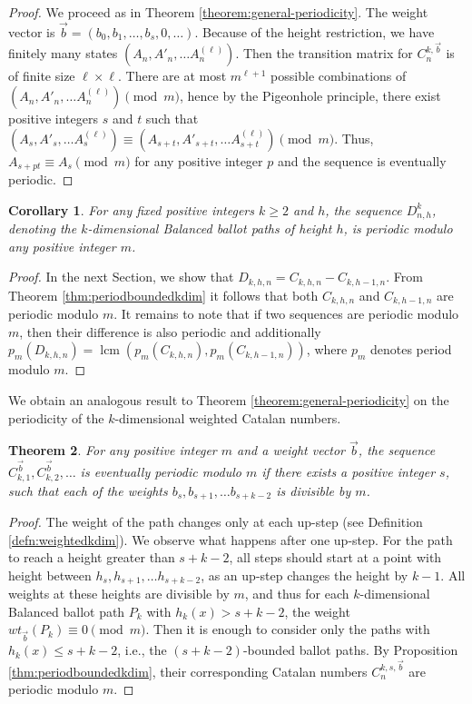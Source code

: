 \documentclass[12pt,notitlepage]{amsart}
\numberwithin{equation}{section}
\theoremstyle{thmstyleone}%
\newtheorem{theorem}{Theorem}[section]%
\newtheorem{corollary}[theorem]{Corollary}%
\theoremstyle{thmstyletwo}%
\theoremstyle{thmstylethree}%
\numberwithin{theorem}{section}
\numberwithin{equation}{section}
\begin{document}
\begin{proof}
    We proceed as in Theorem \ref{theorem:general-periodicity}. The weight vector is $\vec{b} = (b_0,b_1,\ldots,b_s,0,\ldots)$. Because of the height restriction, we have finitely many states $(A_n, A'_n,\ldots A^{(\ell)}_n)$. Then the transition matrix for $C^{k,\vec{b}}_n$ is of finite size $\ell \times \ell$. There are at most $m^{\ell+1}$ possible combinations of $(A_n, A'_n,\ldots A_n^{(\ell)}) \pmod m$, hence by the Pigeonhole principle, there exist positive integers $s$ and $t$ such that $(A_s,A'_s,\ldots A_s^{(\ell)}) \equiv (A_{s+t},A'_{s+t},\ldots A^{(\ell)}_{s+t}) \pmod m$. Thus, $A_{s+pt} \equiv A_{s} \pmod m$ for any positive integer $p$ and the sequence is eventually periodic.
\end{proof}
\begin{corollary}
    For any fixed positive integers $k \geq 2$ and $h$, the sequence $D^k_{n,h}$, denoting the $k$-dimensional Balanced ballot paths of height $h$, is periodic modulo 
    any positive integer $m$.
\end{corollary}
\begin{proof}
    In the next Section, we show that $D_{k,h,n} = C_{k,h,n} - C_{k,h-1,n}$. From Theorem \ref{thm:periodboundedkdim} it follows that both $C_{k,h,n}$ and $C_{k,h-1,n}$ are periodic modulo $m$. It remains to note that if two sequences are periodic modulo $m$, then their difference is also periodic and additionally $p_m(D_{k,h,n}) = \operatorname{lcm}(p_m(C_{k,h,n}), p_m(C_{k,h-1,n}))$, where $p_m$ denotes period modulo $m$.
\end{proof}

We obtain an analogous result to Theorem \ref{theorem:general-periodicity} on the periodicity of the $k$-dimensional weighted Catalan numbers.
\begin{theorem}
\label{theorem:period-weighted-kdim}
    For any positive integer $m$ and a weight vector $\vec{b}$, the sequence $C^{\vec{b}}_{k,1}, C^{\vec{b}}_{k, 2}, \dots$ is eventually periodic modulo $m$ if there exists a positive integer $s$, such that each of the weights $b_s,b_{s+1},\ldots b_{s+k-2}$ is divisible by $m$.
\end{theorem}
\begin{proof}
    The weight of the path changes only at each up-step (see Definition \ref{defn:weightedkdim}). We observe what happens after one up-step. For the path to reach a height greater than $s+k-2$, all steps should start at a point with height between $h_{s}, h_{s+1},\ldots h_{s+k-2}$, as an up-step changes the height by $k-1$. All weights at these heights are divisible by $m$, and thus for each $k$-dimensional Balanced ballot path $P_k$ with $h_k(x)>s+k-2$, the weight $wt_{\vec{b}}(P_k) \equiv 0 \pmod m$. Then it is enough to consider only the paths with $h_k(x) \leq s+k-2$, i.e., the $(s+k-2)$-bounded ballot paths. By Proposition \ref{thm:periodboundedkdim}, their corresponding Catalan numbers $C^{k,s,\vec{b}}_n$ are periodic modulo $m$.
\end{proof}
\end{document}
